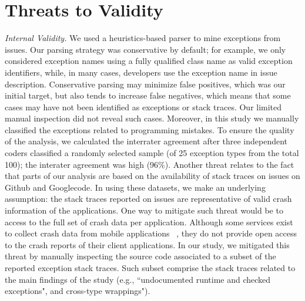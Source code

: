 \documentclass[conference]{IEEEtran}
\begin{document}



\section{Threats to Validity}
\label{sec:threats}

\noindent\emph{Internal Validity.} We used a heuristics-based parser to mine
exceptions from issues.  Our parsing strategy was conservative by default; for
example, we only considered exception names using a fully qualified class name
as valid exception identifiers, while, in many cases, developers use the
exception name in issue description. Conservative parsing may minimize false
positives, which was our initial target, but also tends to increase false
negatives, which means that some cases may have not been identified as
exceptions or stack traces. Our limited manual inspection did not reveal such
cases. Moreover, in this study we manually classified the exceptions 
related to programming mistakes. To ensure the quality of the analysis, 
we calculated the interrater agreement after three independent 
coders classified a randomly selected sample (of 25 exception 
types from the total 100); the interater agreement was high (96\%). 
Another threat relates to the fact that parts of our analysis 
are based on the availability of stack traces on issues on Github and Googlecode. 
In using these datasets, we make an underlying assumption: the stack traces reported on issues are 
representative of valid crash information of the applications. 
One way to mitigate such threat would be to access to the full 
set of crash data per application. Although some services exist 
to collect crash data from mobile applications ~\cite{BugSe14,BugSn14,Googl14,Acra14},
they do not provide open access to the crash reports of their client applications.
In our study, we mitigated this threat by manually inspecting
the source code associated to a subset of the reported exception stack traces.
Such subset comprise the stack traces related to the main findings 
of the study (e.g., ``undocumented runtime and checked exceptions",
and cross-type wrappings").
\end{document}
